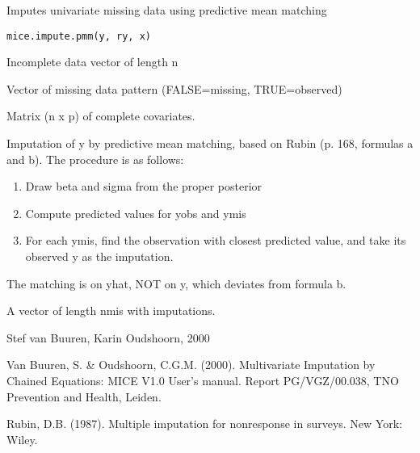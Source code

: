 \documentclass{article}
\begin{document}
\begin{Description}\relax
Imputes univariate missing data using predictive mean matching
\end{Description}
\begin{Usage}
\begin{verbatim}
mice.impute.pmm(y, ry, x)
\end{verbatim}
\end{Usage}
\begin{Arguments}
\begin{ldescription}
\item[\code{y}] Incomplete data vector of length n
\item[\code{ry}] Vector of missing data pattern (FALSE=missing, TRUE=observed)
\item[\code{x}] Matrix (n x p) of complete covariates.
\end{ldescription}
\end{Arguments}
\begin{Details}\relax
Imputation of y by predictive mean matching, based on
Rubin (p. 168, formulas a and b).
The procedure is as follows:
\begin{enumerate}
\item Draw beta and sigma from the proper posterior
\item Compute predicted values for yobs and ymis
\item For each ymis, find the observation with closest predicted
value, and take its observed y as the imputation.
\end{enumerate}
The matching is on yhat, NOT on y, which deviates from formula b.
\end{Details}
\begin{Value}
\begin{ldescription}
\item[\code{imp}] A vector of length nmis with imputations.
\end{ldescription}
\end{Value}
\begin{Author}\relax
Stef van Buuren, Karin Oudshoorn, 2000
\end{Author}
\begin{References}\relax
Van Buuren, S. \& Oudshoorn, C.G.M. (2000). Multivariate Imputation by Chained Equations: 
MICE V1.0 User's manual. Report PG/VGZ/00.038, TNO Prevention and Health, Leiden.

Rubin, D.B. (1987). Multiple imputation for nonresponse in surveys. New York: Wiley.
\end{References}
\end{document}

